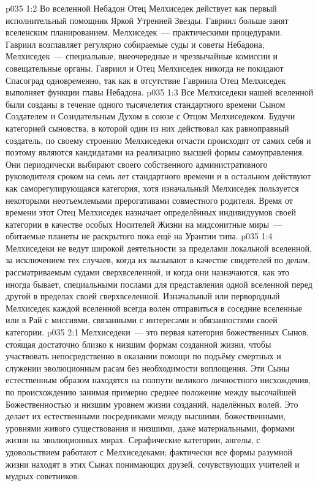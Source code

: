 \vs p035 1:2 Во вселенной Небадон Отец Мелхиседек действует как первый исполнительный помощник Яркой Утренней Звезды. Гавриил больше занят вселенским планированием. Мелхиседек~--- практическими процедурами. Гавриил возглавляет регулярно собираемые суды и советы Небадона, Мелхиседек~--- специальные, внеочередные и чрезвычайные комиссии и совещательные органы. Гавриил и Отец Мелхиседек никогда не покидают Спасоград одновременно, так как в отсутствие Гавриила Отец Мелхиседек выполняет функции главы Небадона.
\vs p035 1:3 Все Мелхиседеки нашей вселенной были созданы в течение одного тысячелетия стандартного времени Сыном Создателем и Созидательным Духом в союзе с Отцом Мелхиседеком. Будучи категорией сыновства, в которой один из них действовал как равноправный создатель, по своему строению Мелхиседеки отчасти происходят от самих себя и поэтому являются кандидатами на реализацию высшей формы самоуправления. Они периодически выбирают своего собственного административного руководителя сроком на семь лет стандартного времени и в остальном действуют как саморегулирующаяся категория, хотя изначальный Мелхиседек пользуется некоторыми неотъемлемыми прерогативами совместного родителя. Время от времени этот Отец Мелхиседек назначает определённых индивидуумов своей категории в качестве особых Носителей Жизни на мидсонитные миры~--- обитаемые планеты не раскрытого пока ещё на Урантии типа.
\vs p035 1:4 Мелхиседеки не ведут широкой деятельности за пределами локальной вселенной, за исключением тех случаев, когда их вызывают в качестве свидетелей по делам, рассматриваемым судами сверхвселенной, и когда они назначаются, как это иногда бывает, специальными послами для представления одной вселенной перед другой в пределах своей сверхвселенной. Изначальный или первородный Мелхиседек каждой вселенной всегда волен отправиться в соседние вселенные или в Рай с миссиями, связанными с интересами и обязанностями своей категории.
\vs p035 2:1 Мелхиседеки~--- это первая категория божественных Сынов, сто\'ящая достаточно близко к низшим формам созданной жизни, чтобы участвовать непосредственно в оказании помощи по подъёму смертных и служении эволюционным расам без необходимости воплощения. Эти Сыны естественным образом находятся на полпути великого личностного нисхождения, по происхождению занимая примерно среднее положение между высочайшей Божественностью и низшим уровнем жизни созданий, наделённых волей. Это делает их естественными посредниками между высшими, божественными, уровнями живого существования и низшими, даже материальными, формами жизни на эволюционных мирах. Серафические категории, ангелы, с удовольствием работают с Мелхиседеками; фактически все формы разумной жизни находят в этих Сынах понимающих друзей, сочувствующих учителей и мудрых советников.
